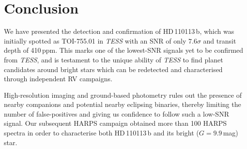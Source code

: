 \documentclass[fleqn,usenatbib]{mnras}
\newcommand{\tess}{{\it TESS}}
\newcommand{\harps}{{HARPS}}
\newcommand{\kms}{km\,s$^{-1}$}
\newcommand{\mss}{\mbox{m\,s$^{-2}$}}
\newcommand{\mstar}{\mbox{$M_{\star}$}}
\newcommand{\rstar}{\mbox{$R_{\star}$}}
\newcommand{\msun}{\mbox{$M_{\odot}$}}
\newcommand{\rsun}{\mbox{$R_{\odot}$}}
\newcommand{\vsini}{$v\sin{i}$}
\newcommand{\teff}{$T_{\rm eff}$}
\newcommand{\feh}{\mbox{$\rm [Fe/H]$}}
\newcommand{\Tlogg}{ $ 4.46 \pm 0.05 $ }
\newcommand{\TFeH}{ $ 0.14 \pm 0.02 $ }
\newcommand{\Tdepth}{410\,ppm}
\newcommand{\TTplanet}{TOI-755.01}
\newcommand{\Tstarage}{4.0\,$\pm$\,0.5 Gyr}
\newcommand{\Tplanet}{HD\,110113\,b}
\begin{document}


\section{Conclusion}
\label{sec:conclusion}
We have presented the detection and confirmation of \Tplanet{}, which was initially spotted as \TTplanet{} in \tess{} with an SNR of only $7.6\sigma$ and transit depth of \Tdepth{}.
This marks one of the lowest-SNR signals yet to be confirmed from \tess{}, and is testament to the unique ability of \tess{} to find planet candidates around bright stars which can be redetected and characterised through independent RV campaigns.

High-resolution imaging and ground-based photometry rules out the presence of nearby companions and potential nearby eclipsing binaries, thereby limiting the number of false-positives and giving us confidence to follow such a low-SNR signal.
Our subsequent HARPS campaign obtained more than 100 \harps{} spectra in order to characterise both \Tplanet{} and its bright ($G=9.9$\,mag) star.
\end{document}
